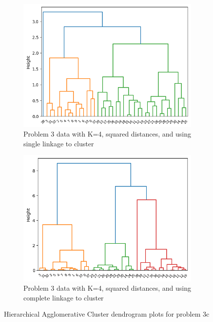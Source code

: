 \documentclass[12pt]{article}
\begin{document}
\begin{figure}[ht!]
    \begin{subfigure}{0.5\textwidth}
        \centering
        \includegraphics[width=\linewidth]{../plots/3e_average_dendrogram.png}
        \caption{Problem 3 data with K=4, squared distances, and using single linkage to cluster}
    \end{subfigure}
    \begin{subfigure}{0.5\textwidth}
        \centering
        \includegraphics[width=\linewidth]{../plots/3e_average_squared_dendrogram.png}
        \caption{Problem 3 data with K=4, squared distances, and using complete linkage to cluster}
    \end{subfigure}
    \caption{Hierarchical Agglomerative Cluster dendrogram plots for problem 3c}\label{fig:3e_den}
\end{figure}
\end{document}
